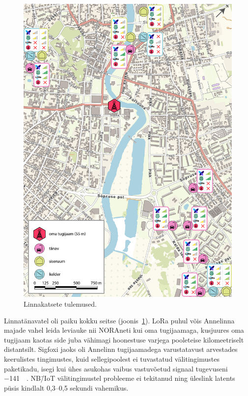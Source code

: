\documentclass[12pt]{article}
\begin{document}
    \begin{figure} [p]
        \begin{center}
            \vspace*{-0.5cm}
            \includegraphics[width=1\textwidth]{figures/annelinn2.jpg}
            \caption{Linnakatsete tulemused.}
            \label{fig:annelinn}
        \end{center}
    \end{figure}

    Linnatänavatel oli paiku kokku seitse (joonis~\ref{fig:annelinn}).
    LoRa puhul võis Annelinna majade vahel leida leviauke nii NORAneti kui oma tugijaamaga, kusjuures oma tugijaam kaotas side juba vähimagi hoonestuse varjega pooleteise kilomeetriselt distantsilt.
    Sigfoxi jaoks oli Annelinn tugijaamadega varustatavust arvestades keerulistes tingimustes, kuid sellegipoolest ei tuvastatud välitingimustes paketikadu, isegi kui ühes asukohas vaibus vastuvõetud signaal tugevuseni \SI{-141}{\deci\belm}.
    NB\=/IoT välitingimustel probleeme ei tekitanud ning üleslink latents püsis kindlalt 0,3--0,5 sekundi vahemikus.
\end{document}
